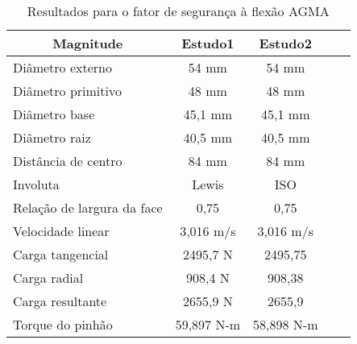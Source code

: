 \begin{table}[]
\centering
\caption{\label{tab8} Resultados para o fator de segurança à flexão AGMA}
\begin{tabular}{l c c c c}
\hline
\multicolumn{1}{c}{\textbf{Magnitude}} & \textbf{Estudo1} & \textbf{Estudo2} \\ \hline
Diâmetro externo              & 54 mm       & 54 mm         \\
Diâmetro primitivo            & 48 mm       & 48 mm         \\
Diâmetro base                 & 45,1 mm     & 45,1 mm       \\
Diâmetro raiz                 & 40,5 mm     & 40,5 mm       \\
Distância de centro           & 84 mm       & 84 mm         \\
Involuta                      & Lewis       & ISO           \\
Relação de largura da face    & 0,75        & 0,75          \\
Velocidade linear             & 3,016 m/s   & 3,016 m/s     \\
Carga tangencial              & 2495,7 N    & 2495,75       \\
Carga radial                  & 908,4 N     & 908,38        \\
Carga resultante              & 2655,9 N    & 2655,9        \\
Torque do pinhão              & 59,897 N-m  & 58,898 N-m    \\ \hline
\end{tabular}
\end{table}